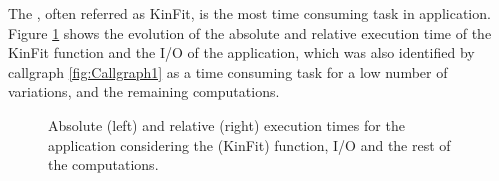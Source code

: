 The \ttDilepKinFit, often referred as KinFit, is the most time consuming task in \tth application. Figure \ref{fig:KinFitGraph} shows the evolution of the absolute and relative execution time of the KinFit function and the I/O of the application, which was also identified by callgraph \ref{fig:Callgraph1} as a time consuming task for a low number of variations, and the remaining computations.

\begin{figure}[!htp]
	\begin{center}
		\caption{Absolute (left) and relative (right) execution times for the \tth application considering the \ttDilepKinFit (KinFit) function, I/O and the rest of the computations.}
		\label{fig:KinFitGraph}
	\end{center}
\end{figure}

